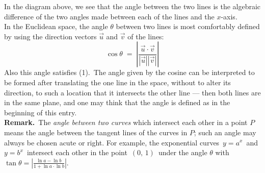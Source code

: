 \documentclass[12pt]{article}
\theoremstyle{definition}
\begin{document}
In the diagram above, we see that the angle between the two lines is the algebraic difference of the two angles made between each of the lines and the $x$-axis.\\

In the Euclidean space, the angle $\theta$ between two lines is most comfortably defined by using the direction vectors $\vec{u}$ and $\vec{v}$ of the lines:
$$\cos\theta \;=\; \left|\frac{\vec{u}\cdot\vec{v}}{|\vec{u}||\vec{v}|}\right|$$
Also this angle satisfies (1).\, The angle given by the cosine can be interpreted to be formed after translating the one line in the space, without to alter its direction, to such a location that it intersects the other line --- then both lines are in the same plane, and one may think that the angle is defined as in the beginning of this entry. \\

\textbf{Remark.}\, The {\em angle between two curves} which intersect each other in a point $P$ means the angle between the tangent lines of the curves in $P$; such an angle may always be chosen acute or right.  For example, the exponential curves \,$y = a^x$\, and\, $y = b^x$\, intersect each other in the point \,$(0,\,1)$\, under the angle $\theta$ with\, $\tan\theta = 
|\frac{\ln{a}-\ln{b}}{1+\ln{a}\cdot\ln{b}}|$.
\end{document}
